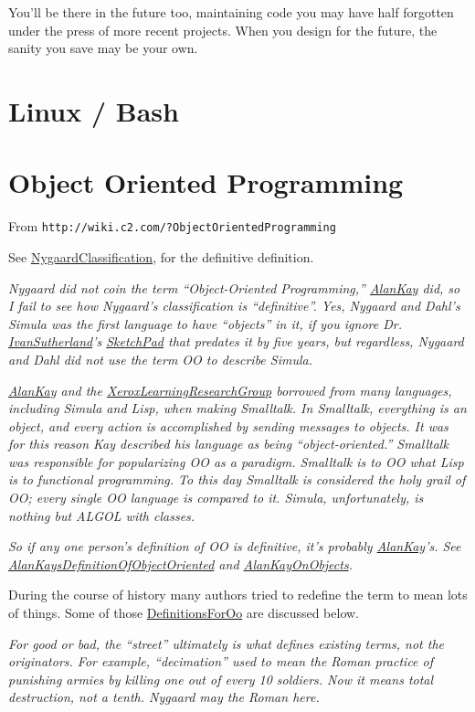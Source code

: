 \documentclass[10pt,twoside,openright]{memoir}
\begin{document}
You'll be there in the future too, maintaining code you may have half forgotten under the press of more recent projects. When you design for the future, the sanity you save may be your own.


\chapter{Linux / Bash}

\chapter{Object Oriented Programming}

From {\footnotesize \texttt{http://wiki.c2.com/?ObjectOrientedProgramming}}

\vskip 0.1in

\noindent See \ul{NygaardClassification}, for the definitive definition.

\emph{Nygaard did not coin the term ``Object-Oriented Programming,'' \ul{AlanKay} did, so I fail to see how Nygaard's classification is ``definitive''. Yes, Nygaard and Dahl's Simula was the first language to have ``objects'' in it, if you ignore Dr. \ul{IvanSutherland}'s \ul{SketchPad} that predates it by five years, but regardless, Nygaard and Dahl did not use the term OO to describe Simula.}

\emph{\ul{AlanKay} and the \ul{XeroxLearningResearchGroup} borrowed from many languages, including Simula and Lisp, when making Smalltalk. In Smalltalk, everything is an object, and every action is accomplished by sending messages to objects. It was for this reason Kay described his language as being ``object-oriented.'' Smalltalk was responsible for popularizing OO as a paradigm. Smalltalk is to OO what Lisp is to functional programming. To this day Smalltalk is considered the holy grail of OO; every single OO language is compared to it. Simula, unfortunately, is nothing but ALGOL with classes.}

\emph{So if any one person's definition of OO is definitive, it's probably \ul{AlanKay}'s. See \ul{AlanKaysDefinitionOfObjectOriented} and \ul{AlanKayOnObjects}.}

During the course of history many authors tried to redefine the term to mean lots of things. Some of those \ul{DefinitionsForOo} are discussed below.

\emph{For good or bad, the ``street'' ultimately is what defines existing terms, not the originators. For example, ``decimation'' used to mean the Roman practice of punishing armies by killing one out of every 10 soldiers. Now it means total destruction, not a tenth. Nygaard may the Roman here.}
\end{document}
